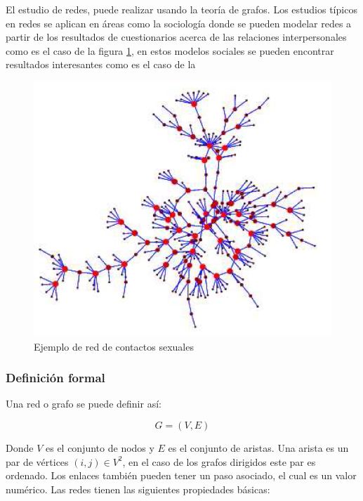 El estudio de redes, puede realizar usando la teoría de grafos. Los estudios típicos en redes se aplican en áreas como la sociología donde se pueden modelar redes a partir de los resultados de cuestionarios acerca de las relaciones interpersonales como es el caso de la figura \ref{fig:contactosSexuales}, en estos modelos sociales se pueden encontrar resultados interesantes como es el caso de la

\begin{figure}[H]
    \centering
    \includegraphics[scale=0.3]{Capitulo2EstadoDelArte/imagenes/contactos.png}
    \caption{Ejemplo de red de contactos sexuales \cite{Newman2003}}
    \label{fig:contactosSexuales}
\end{figure}

\subsubsection{Definición formal}

Una red o grafo se puede definir así:

\begin{equation}
    G = (V,E)
\end{equation}

Donde $V$ es el conjunto de nodos y $E$ es el conjunto de aristas. Una arista es un par de vértices $(i,j)\in V^2$, en el caso de los grafos dirigidos este par es ordenado. Los enlaces también pueden tener un paso asociado, el cual es un valor numérico. Las redes tienen las siguientes propiedades básicas:

